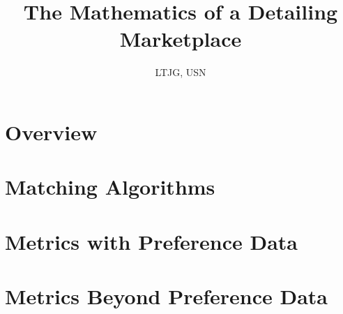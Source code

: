 \documentclass{article}
\title{The Mathematics of a Detailing Marketplace}
\author{\studentname \qquad LTJG, USN}
\begin{document}
\maketitle



\newpage

\tableofcontents

\newpage

\section{Overview}



\section{Matching Algorithms}
\label{Matching}







\section{Metrics with Preference Data}
\label{Metrics}









\section{Metrics Beyond Preference Data}
\label{Beyond}







\end{document}
